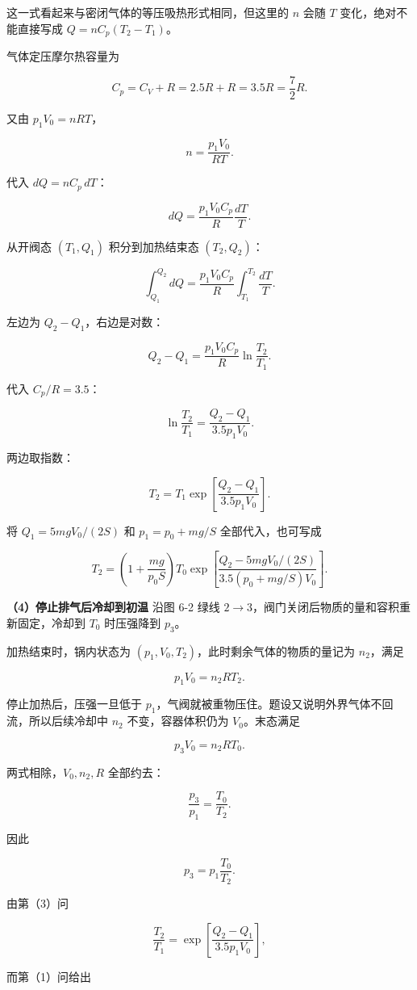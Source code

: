 \documentclass[12pt,a4paper,UTF8]{ctexart}
\begin{document}
这一式看起来与密闭气体的等压吸热形式相同，但这里的 \(n\) 会随 \(T\)
变化，绝对不能直接写成 \(Q=nC_p(T_2-T_1)\)。

气体定压摩尔热容量为

\[C_p=C_V+R=2.5R+R=3.5R=\frac72R.\]

又由 \(p_1V_0=nRT\)，

\[n=\frac{p_1V_0}{RT}.\]

代入 \(dQ=nC_p\,dT\)：

\[dQ=\frac{p_1V_0C_p}{R}\frac{dT}{T}.\]

从开阀态 \((T_1,Q_1)\) 积分到加热结束态 \((T_2,Q_2)\)：

\[\int_{Q_1}^{Q_2}dQ
=\frac{p_1V_0C_p}{R}
\int_{T_1}^{T_2}\frac{dT}{T}.\]

左边为 \(Q_2-Q_1\)，右边是对数：

\[Q_2-Q_1
=\frac{p_1V_0C_p}{R}
\ln\frac{T_2}{T_1}.\]

代入 \(C_p/R=3.5\)：

\[\ln\frac{T_2}{T_1}
=\frac{Q_2-Q_1}{3.5p_1V_0}.\]

两边取指数：

\[\boxed{
T_2=T_1\exp\left[
\frac{Q_2-Q_1}{3.5p_1V_0}
\right]
}.\]

将 \(Q_1=5mgV_0/(2S)\) 和 \(p_1=p_0+mg/S\) 全部代入，也可写成

\[\boxed{
T_2=\left(1+\frac{mg}{p_0S}\right)T_0
\exp\left[
\frac{Q_2-5mgV_0/(2S)}
{3.5\left(p_0+mg/S\right)V_0}
\right]
}.\]

\textbf{（4）停止排气后冷却到初温} 沿图 6-2 绿线
\(2\to3\)，阀门关闭后物质的量和容积重新固定，冷却到 \(T_0\) 时压强降到
\(p_3\)。

加热结束时，锅内状态为 \((p_1,V_0,T_2)\)，此时剩余气体的物质的量记为
\(n_2\)，满足

\[p_1V_0=n_2RT_2.\]

停止加热后，压强一旦低于
\(p_1\)，气阀就被重物压住。题设又说明外界气体不回流，所以后续冷却中
\(n_2\) 不变，容器体积仍为 \(V_0\)。末态满足

\[p_3V_0=n_2RT_0.\]

两式相除，\(V_0,n_2,R\) 全部约去：

\[\frac{p_3}{p_1}=\frac{T_0}{T_2}.\]

因此

\[p_3=p_1\frac{T_0}{T_2}.\]

由第（3）问

\[\frac{T_2}{T_1}
=\exp\left[\frac{Q_2-Q_1}{3.5p_1V_0}\right],\]

而第（1）问给出
\end{document}
